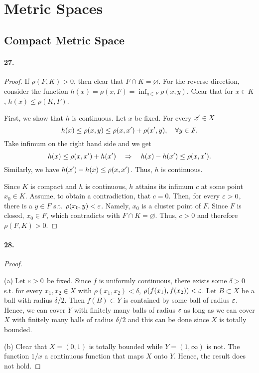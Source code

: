 \section{Metric Spaces}
\setcounter{subsection}{6}
\subsection{Compact Metric Space}
\paragraph{27.}
\begin{proof}
  If $\rho(F, K) > 0$, then clear that $F\cap K = \varnothing$. For the reverse
  direction, consider the function $h(x) = \rho(x, F)= \inf_{y\in F}\rho(x,y)$.
  Clear that for $x\in K$, $h(x) \le \rho(K, F)$.

  First, we show that $h$ is continuous. Let $x$ be fixed. For every
  $x^\prime \in X$
  \[
    h(x) \le \rho(x, y) \le \rho(x, x^\prime) + \rho(x^\prime, y),
    \quad\forall y\in F.
  \]
  Take infimum on the right hand side and we get
  \[
    h(x) \le \rho(x, x^\prime) + h(x^\prime)
    \quad\Rightarrow\quad
    h(x) - h(x^\prime) \le \rho(x, x^\prime).
  \]
  Similarly, we have $h(x^\prime) - h(x) \le \rho(x, x^\prime)$. Thus, $h$ is
  continuous.
  
  Since $K$ is compact and $h$ is continuous, $h$ attains its infimum $c$
  at some point $x_0 \in K$. Assume, to obtain a contradiction, that $c = 0$.
  Then, for every $\varepsilon > 0$, there is a $y \in F$ s.t. $\rho(x_0, y) < \varepsilon$.
  Namely, $x_0$ is a cluster point of $F$. Since $F$ is closed, $x_0 \in F$, 
  which contradicts with $F\cap K=\varnothing$. Thus, $c > 0$ and therefore
  $\rho(F, K) > 0$.
\end{proof}

\paragraph{28.}
\begin{proof}
  $\,$\par
  (a) Let $\varepsilon > 0$ be fixed. Since $f$ is uniformly continuous, there exists
  some $\delta > 0$ s.t. for every $x_1,x_2\in X$ with $\rho(x_1, x_2) < 
  \delta$, $\rho(f(x_1), f(x_2)) < \varepsilon$. Let $B\subset X$ be a ball with
  radius $\delta/2$. Then $f(B) \subset Y$ is contained by some ball of 
  radius $\varepsilon$. Hence, we can cover $Y$ with finitely many balls of radius
  $\varepsilon$ as long as we can cover $X$ with finitely many balls of radius 
  $\delta / 2$ and this can be done since $X$ is totally bounded.
  
  (b) Clear that $X = (0, 1)$ is totally bounded while $Y = (1, \infty)$ is
  not. The function $1/x$ a continuous function that maps $X$ onto $Y$. Hence,
  the result does not hold. 
\end{proof}


